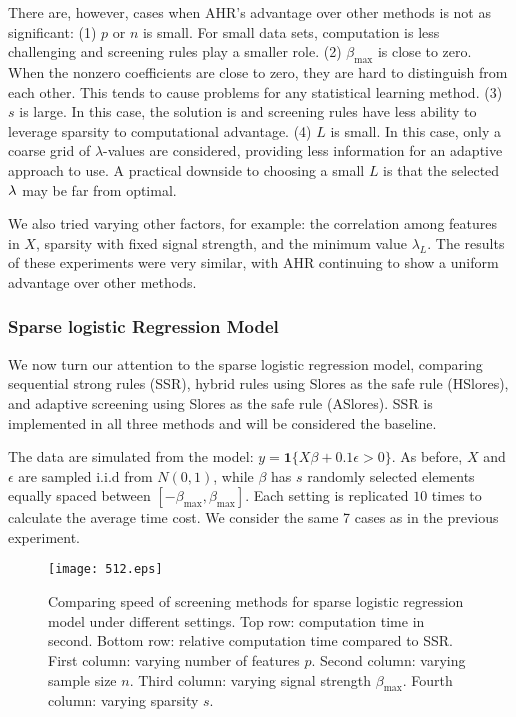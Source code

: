 There are, however, cases when AHR's advantage over other methods is not as significant: (1) $p$ or $n$ is small. For small data sets, computation is less challenging and screening rules play a smaller role. (2) $\beta_{\max}$ is close to zero. When the nonzero coefficients are close to zero, they are hard to distinguish from each other. This tends to cause problems for any statistical learning method. (3) $s$ is large. In this case, the solution is  and screening rules have less ability to leverage sparsity to computational advantage. (4) $L$ is small. In this case, only a coarse grid of $\lambda$-values are considered, providing less information for an adaptive approach to use. A practical downside to choosing a small $L$ is that the selected $\lambda$ may be far from optimal.

We also tried varying other factors, for example: the correlation among features in $X$, sparsity with fixed signal strength, and the minimum value $\lambda_L$. The results of these experiments were very similar, with AHR continuing to show a uniform advantage over other methods.

\subsubsection{Sparse logistic Regression Model}

We now turn our attention to the sparse logistic regression model, comparing sequential strong rules (SSR), hybrid rules using Slores as the safe rule (HSlores), and adaptive screening using Slores as the safe rule (ASlores). SSR is implemented in all three methods and will be considered the baseline.

The data are simulated from the model: $y=\mathbf{1}\{X\beta+0.1\epsilon >0\}$. As before, $X$ and $\epsilon$ are sampled i.i.d from $N(0,1)$, while $\beta$ has $s$ randomly selected elements equally spaced between $[-\beta_{\max},\beta_{\max}]$. Each setting is replicated $10$ times to calculate the average time cost. We consider the same 7 cases as in the previous experiment.

\begin{figure}[h]
    \centering
    \texttt{[image: 512.eps]}    \caption{Comparing speed of screening methods for sparse logistic regression model under different settings. Top row: computation time in second. Bottom row: relative computation time compared to SSR. First column: varying number of features $p$. Second column: varying sample size $n$. Third column: varying signal strength $\beta_{\max}$. Fourth column: varying sparsity $s$.}
    \label{fig:5.1.2a}
\end{figure}

